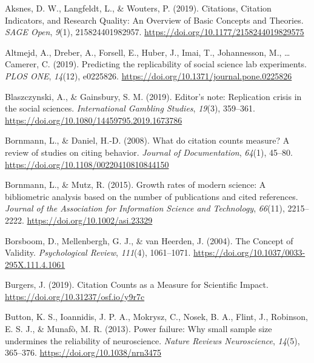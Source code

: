 \documentclass[
  english,
  man,floatsintext]{apa6}
\newlength{\cslhangindent}
\newlength{\cslentryspacingunit} %
\newenvironment{CSLReferences}[2] %
 {%
  \setlength{\parindent}{0pt}
  \ifodd #1
  \let\oldpar\par
  \def\par{\hangindent=\cslhangindent\oldpar}
  \fi
  \setlength{\parskip}{#2\cslentryspacingunit}
 }%
 {}
\begin{document}
\hypertarget{refs}{}
\begin{CSLReferences}{1}{0}
\leavevmode{}%
Aksnes, D. W., Langfeldt, L., \& Wouters, P. (2019). Citations, {Citation Indicators}, and {Research Quality}: {An Overview} of {Basic Concepts} and {Theories}. \emph{SAGE Open}, \emph{9}(1), 215824401982957. \url{https://doi.org/10.1177/2158244019829575}

\leavevmode{}%
Altmejd, A., Dreber, A., Forsell, E., Huber, J., Imai, T., Johannesson, M., \ldots{} Camerer, C. (2019). Predicting the replicability of social science lab experiments. \emph{PLOS ONE}, \emph{14}(12), e0225826. \url{https://doi.org/10.1371/journal.pone.0225826}

\leavevmode{}%
Blaszczynski, A., \& Gainsbury, S. M. (2019). Editor's note: Replication crisis in the social sciences. \emph{International Gambling Studies}, \emph{19}(3), 359--361. \url{https://doi.org/10.1080/14459795.2019.1673786}

\leavevmode{}%
Bornmann, L., \& Daniel, H.-D. (2008). What do citation counts measure? {A} review of studies on citing behavior. \emph{Journal of Documentation}, \emph{64}(1), 45--80. \url{https://doi.org/10.1108/00220410810844150}

\leavevmode{}%
Bornmann, L., \& Mutz, R. (2015). Growth rates of modern science: {A} bibliometric analysis based on the number of publications and cited references. \emph{Journal of the Association for Information Science and Technology}, \emph{66}(11), 2215--2222. \url{https://doi.org/10.1002/asi.23329}

\leavevmode{}%
Borsboom, D., Mellenbergh, G. J., \& van Heerden, J. (2004). The {Concept} of {Validity}. \emph{Psychological Review}, \emph{111}(4), 1061--1071. \url{https://doi.org/10.1037/0033-295X.111.4.1061}

\leavevmode{}%
Burgers, J. (2019). Citation {Counts} as a {Measure} for {Scientific Impact}. \url{https://doi.org/10.31237/osf.io/y9r7c}

\leavevmode{}%
Button, K. S., Ioannidis, J. P. A., Mokrysz, C., Nosek, B. A., Flint, J., Robinson, E. S. J., \& Munafò, M. R. (2013). Power failure: Why small sample size undermines the reliability of neuroscience. \emph{Nature Reviews Neuroscience}, \emph{14}(5), 365--376. \url{https://doi.org/10.1038/nrn3475}


\end{CSLReferences}
\end{document}
